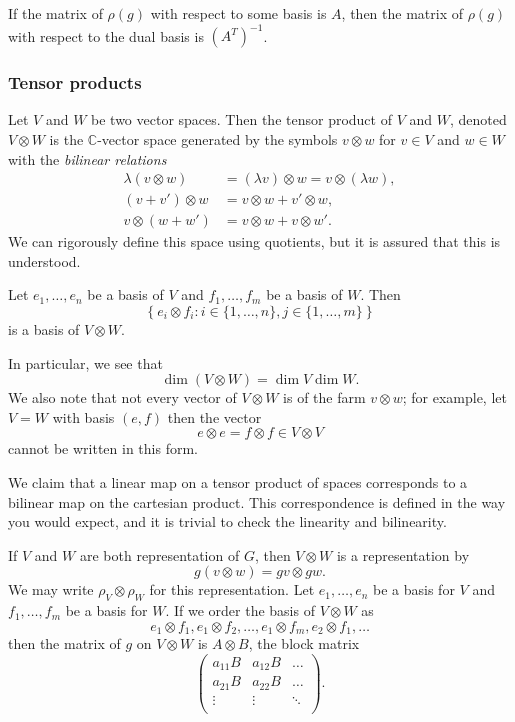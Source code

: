 If the matrix of $\rho(g)$ with respect to some basis is $A$, then the matrix of $\rho(g)$ with respect to the dual basis is $(A^T)^{-1}$.

\subsubsection{Tensor products}

Let $V$ and $W$ be two vector spaces. Then the tensor product of $V$ and $W$, denoted $V \otimes W$ is the $\mathbb C$-vector space generated by the symbols $v \otimes w$ for $v \in V$ and $w \in W$ with the \emph{bilinear relations}
\begin{align*}
    \lambda(v \otimes w) & = (\lambda v) \otimes w = v \otimes (\lambda w), \\
    (v + v') \otimes w   & = v \otimes w + v' \otimes w,                    \\
    v \otimes (w + w')   & = v \otimes w + v \otimes w'.
\end{align*}
We can rigorously define this space using quotients, but it is assured that this is understood.

\begin{proposition}
    Let $e_1, \ldots, e_n$ be a basis of $V$ and $f_1, \ldots, f_m$ be a basis of $W$. Then
    \[ \left\{e_i \otimes f_i: i \in \{1, \ldots, n\}, j \in \{1, \ldots, m\}\right\} \]
    is a basis of $V \otimes W$.
\end{proposition}

In particular, we see that
\[ \dim(V \otimes W) = \dim V \dim W. \]
We also note that not every vector of $V \otimes W$ is of the farm $v \otimes w$; for example, let $V = W$ with basis $(e, f)$ then the vector
\[ e \otimes e = f \otimes f \in V \otimes V \]
cannot be written in this form.

We claim that a linear map on a tensor product of spaces corresponds to a bilinear map on the cartesian product. This correspondence is defined in the way you would expect, and it is trivial to check the linearity and bilinearity.

If $V$ and $W$ are both representation of $G$, then $V \otimes W$ is a representation by
\[ g(v \otimes w) = gv \otimes gw. \]
We may write $\rho_V \otimes \rho_W$ for this representation. Let $e_1, \ldots, e_n$ be a basis for $V$ and $f_1, \ldots, f_m$ be a basis for $W$. If we order the basis of $V \otimes W$ as
\[ e_1 \otimes f_1, e_1 \otimes f_2, \ldots, e_1 \otimes f_m, e_2 \otimes f_1, \ldots \]
then the matrix of $g$ on $V \otimes W$ is $A \otimes B$, the block matrix
\[
    \begin{pmatrix}
        a_{11} B & a_{12} B & \ldots \\
        a_{21} B & a_{22} B & \ldots \\
        \vdots   & \vdots   & \ddots \\
    \end{pmatrix}.
\]

